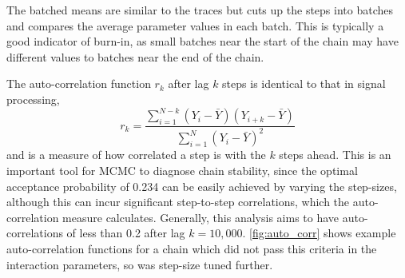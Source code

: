 The batched means are similar to the traces but cuts up the steps into batches and compares the average parameter values in each batch. This is typically a good indicator of burn-in, as small batches near the start of the chain may have different values to batches near the end of the chain.

The auto-correlation function $r_k$ after lag $k$ steps is identical to that in signal processing,
\begin{equation}
r_k = \frac{\sum_{i=1}^{N-k}\left(Y_i-\bar{Y}\right) \left(Y_{i+k} - \bar{Y}\right)} {\sum_{i=1}^N \left(Y_i-\bar{Y}\right)^2 }
\end{equation}
and is a measure of how correlated a step is with the $k$ steps ahead. This is an important tool for MCMC to diagnose chain stability, since the optimal acceptance probability of 0.234 can be easily achieved by varying the step-sizes, although this can incur significant step-to-step correlations, which the auto-correlation measure calculates. Generally, this analysis aims to have auto-correlations of less than 0.2 after lag $k=10,000$. \autoref{fig:auto_corr} shows example auto-correlation functions for a chain which did not pass this criteria in the interaction parameters, so was step-size tuned further.
